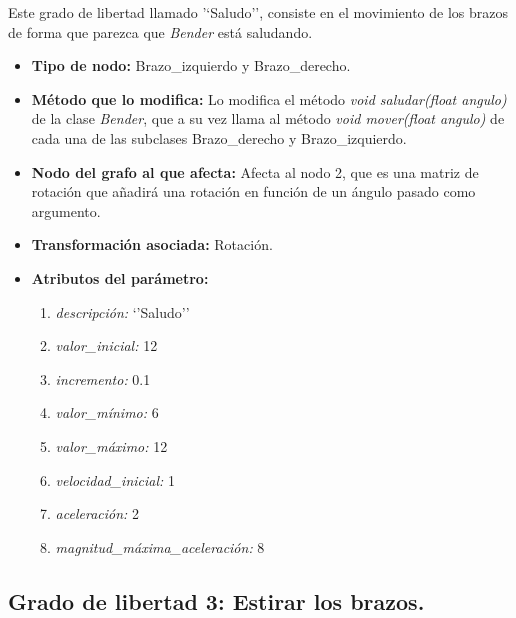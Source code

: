 \documentclass{article}
\begin{document}
	Este grado de libertad llamado '`Saludo'', consiste en el movimiento de los brazos de forma que parezca que \textit{Bender} está saludando.
	
	\begin{itemize}
		\item \textbf{Tipo de nodo: } Brazo\_izquierdo y Brazo\_derecho.
		\item \textbf{Método que lo modifica: } Lo modifica el método \textit{void saludar(float angulo)} de la clase \textit{Bender}, que a su vez llama al método \textit{void mover(float angulo)} de cada una de las subclases Brazo\_derecho y Brazo\_izquierdo.
		\item \textbf{Nodo del grafo al que afecta: } Afecta al nodo 2, que es una matriz de rotación que añadirá una rotación en función de un ángulo pasado como argumento.
		\item \textbf{Transformación asociada: } Rotación.
		\item \textbf{Atributos del parámetro: }
		\begin{enumerate}
			\item \textit{descripción: } `'Saludo''
			\item  \textit{valor\_inicial:} 12
			\item \textit{incremento: } 0.1
			\item \textit{valor\_mínimo: } 6
			\item \textit{valor\_máximo: } 12
			\item \textit{velocidad\_inicial: } 1
			\item \textit{aceleración: } 2
			\item \textit{magnitud\_máxima\_aceleración: }  8
		\end{enumerate}
	\end{itemize}

	\subsection{Grado de libertad 3: Estirar los brazos.}
	
\end{document}
